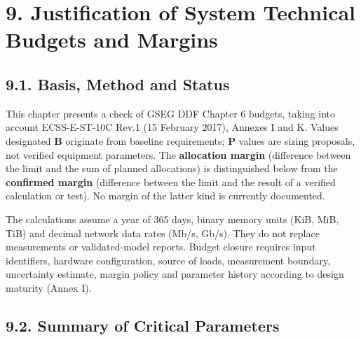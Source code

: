\section{9. Justification of System Technical Budgets and Margins}\label{ddjf-9}

\subsection{9.1. Basis, Method and Status}\label{ddjf-9-1}

This chapter presents a check of GSEG DDF Chapter 6 budgets, taking into account ECSS-E-ST-10C Rev.1 (15 February 2017), Annexes I and K. Values designated \textbf{B} originate from baseline requirements; \textbf{P} values are sizing proposals, not verified equipment parameters. The \textbf{allocation margin} (difference between the limit and the sum of planned allocations) is distinguished below from the \textbf{confirmed margin} (difference between the limit and the result of a verified calculation or test). No margin of the latter kind is currently documented.

The calculations assume a year of 365 days, binary memory units (KiB, MiB, TiB) and decimal network data rates (Mb/\allowbreak{}s, Gb/\allowbreak{}s). They do not replace measurements or validated-model reports. Budget closure requires input identifiers, hardware configuration, source of loads, measurement boundary, uncertainty estimate, margin policy and parameter history according to design maturity (Annex I).

\subsection{9.2. Summary of Critical Parameters}\label{ddjf-9-2}

